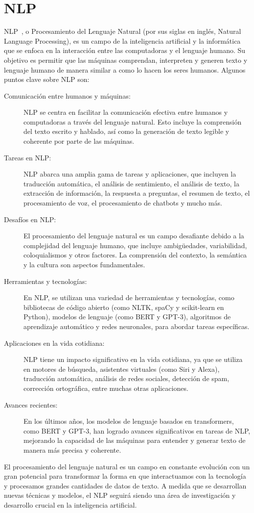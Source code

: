 \section{NLP}
NLP~\cite{nlp1}, o Procesamiento del Lenguaje Natural (por sus siglas en inglés, Natural Language Processing),
es un campo de la inteligencia artificial y la informática que se enfoca en la interacción
entre las computadoras y el lenguaje humano.
Su objetivo es permitir que las máquinas comprendan, interpreten y generen texto
y lenguaje humano de manera similar a como lo hacen los seres humanos.
Algunos puntos clave sobre NLP son:
\begin{description}
    \item[Comunicación entre humanos y máquinas:] NLP se centra en facilitar la comunicación efectiva entre humanos y computadoras a través del lenguaje natural. Esto incluye la comprensión del texto escrito y hablado, así como la generación de texto legible y coherente por parte de las máquinas.
    \item[Tareas en NLP:] NLP abarca una amplia gama de tareas y aplicaciones, que incluyen la traducción automática, el análisis de sentimiento, el análisis de texto, la extracción de información, la respuesta a preguntas, el resumen de texto, el procesamiento de voz, el procesamiento de chatbots y mucho más.
    \item[Desafíos en NLP:] El procesamiento del lenguaje natural es un campo desafiante debido a la complejidad del lenguaje humano, que incluye ambigüedades, variabilidad, coloquialismos y otros factores. La comprensión del contexto, la semántica y la cultura son aspectos fundamentales.
    \item[Herramientas y tecnologías:] En NLP, se utilizan una variedad de herramientas y tecnologías, como bibliotecas de código abierto (como NLTK, spaCy y scikit-learn en Python), modelos de lenguaje (como BERT y GPT-3), algoritmos de aprendizaje automático y redes neuronales, para abordar tareas específicas.
    \item[Aplicaciones en la vida cotidiana:] NLP tiene un impacto significativo en la vida cotidiana, ya que se utiliza en motores de búsqueda, asistentes virtuales (como Siri y Alexa), traducción automática, análisis de redes sociales, detección de spam, corrección ortográfica, entre muchas otras aplicaciones.
    \item[Avances recientes:] En los últimos años, los modelos de lenguaje basados en transformers, como BERT y GPT-3, han logrado avances significativos en tareas de NLP, mejorando la capacidad de las máquinas para entender y generar texto de manera más precisa y coherente.
\end{description}
El procesamiento del lenguaje natural es un campo en constante evolución 
con un gran potencial para transformar la forma en que interactuamos 
con la tecnología y procesamos grandes cantidades de datos de texto. 
A medida que se desarrollan nuevas técnicas y modelos, 
el NLP seguirá siendo una área de investigación y desarrollo crucial en la inteligencia artificial.



